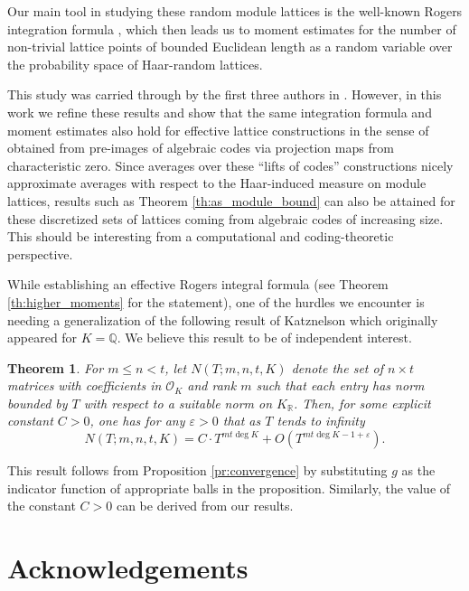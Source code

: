 \documentclass{amsart}
\newtheorem{theorem}{Theorem}
\newcommand{\OK}{\mathcal{O}_K}
\newcommand{\KR}{K_\mathbb{R}}
\begin{document}
Our main tool in studying these random module lattices is the well-known Rogers integration formula \cite{K19,hughes2023mean,GSV23}, which then leads us to moment estimates for the number of non-trivial lattice points of bounded Euclidean length as a random variable over the probability space of Haar-random lattices. \par
This study was carried through by the first three authors in \cite{GSV23}. However, in this work we refine these results and show that the same integration formula and moment estimates also hold for effective lattice constructions in the sense of \cite{GM03,M16} obtained from pre-images of algebraic codes via projection maps from characteristic zero. Since averages over these ``lifts of codes'' constructions nicely 
approximate averages with respect to the Haar-induced measure on module lattices,
results such as Theorem \ref{th:as_module_bound} can also be attained for these discretized sets of lattices coming from algebraic codes of increasing size. This should be interesting from a computational and coding-theoretic perspective.



While establishing an effective Rogers integral formula (see Theorem \ref{th:higher_moments} for the statement), one of the hurdles we encounter is needing a generalization of the following result of Katznelson \cite{K1994} which originally appeared for $K=\mathbb{Q}$. We believe this result to be of independent interest.
\begin{theorem}\label{thm:KatznelsonOK}
For $m\leq n<t$, let $N(T;m,n,t,K)$ denote the set of $n \times t$ matrices with coefficients in $\OK$ and rank $m$ such that each entry has norm bounded by $T$ with respect to a suitable norm on $\KR$. Then, for some explicit constant $C>0$, one has for any $\varepsilon > 0$ that as $T$ tends to infinity
\begin{equation}
    N(T;m,n,t,K) = C \cdot T^{mt \deg K} + O(T^{mt\deg K-1+\varepsilon}).
\end{equation}

\end{theorem}
This result follows from Proposition \ref{pr:convergence} by substituting $g$ as the indicator function of appropriate balls in the proposition. Similarly, the value of the constant $C>0$ can be derived from our results.


\section*{Acknowledgements}
\end{document}
